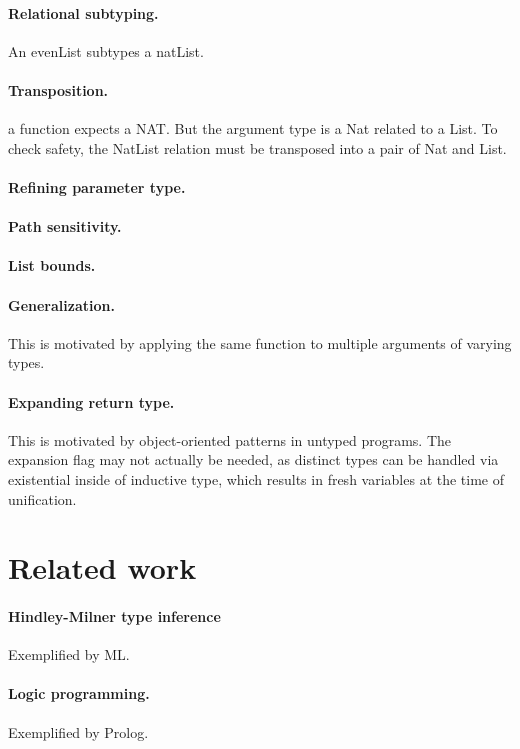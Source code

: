 \documentclass[acmsmall]{acmart}
\begin{document}
\paragraph{Relational subtyping.} An evenList subtypes a natList.
\paragraph{Transposition.} a function expects a NAT. 
But the argument type is a Nat related to a List.
To check safety, the NatList relation must be transposed into a pair of Nat and List.
\paragraph{Refining parameter type.}
\paragraph{Path sensitivity.}
\paragraph{List bounds.}
\paragraph{Generalization.} This is motivated by applying the same function to multiple arguments of varying types.
\paragraph{Expanding return type.}  
This is motivated by object-oriented patterns in untyped programs.
The expansion flag may not actually be needed, as distinct types can be handled via existential inside of inductive type,
which results in fresh variables at the time of unification.

\section{Related work}

\paragraph{Hindley-Milner type inference}
Exemplified by ML.

\paragraph{Logic programming.}
Exemplified by Prolog. 
\end{document}
